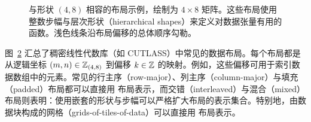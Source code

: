 \begin{figure}[ht]
\begin{subfigure}[t]{0.3\textwidth}
  \label{fig:layouts:broadcast}
\end{subfigure}
\caption{与形状 $(4,8)$ 相容的布局示例，绘制为 $4 {\times} 8$ 矩阵。这些布局使用整数步幅与层次形状（hierarchical shapes）来定义对数据张量有用的函数。浅色线条沿布局偏移的总体顺序勾勒。}
\label{fig:layouts}
\end{figure}

图~\ref{fig:layouts} 汇总了稠密线性代数库（如 CUTLASS）中常见的数据布局。每个布局都是从逻辑坐标 $(m,n) \in \mathbb{Z}_{(4,8)}$ 到偏移 $k \in \mathbb{Z}$ 的映射。例如，这些偏移可用于索引数据数组中的元素。常见的行主序（row-major）、列主序（column-major）与填充（padded）布局都可以直接用 \CuTe 布局表示，而交错（interleaved）与混合（mixed）布局则表明：使用嵌套的形状与步幅可以严格扩大布局的表示集合。特别地，由数据块构成的网格（grids-of-tiles-of-data）可以直接用 \CuTe 布局表示。

